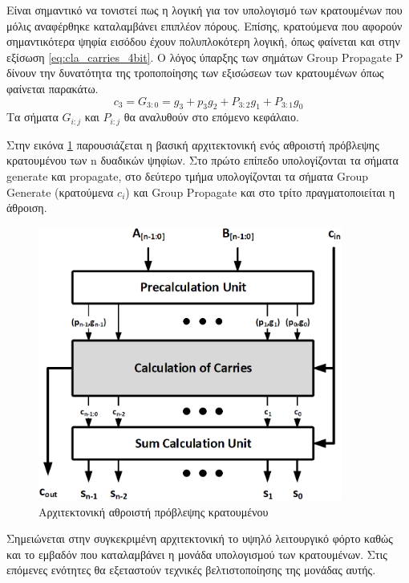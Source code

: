 Είναι σημαντικό να τονιστεί πως η λογική για τον υπολογισμό των κρατουμένων που μόλις αναφέρθηκε καταλαμβάνει επιπλέον πόρους. Επίσης, κρατούμενα που αφορούν σημαντικότερα ψηφία εισόδου έχουν πολυπλοκότερη λογική, όπως φαίνεται και στην εξίσωση \ref{eq:cla_carries_4bit}. Ο λόγος ύπαρξης των σημάτων Group Propagate P δίνουν την δυνατότητα της τροποποίησης των εξισώσεων των κρατουμένων όπως φαίνεται παρακάτω. 
\begin{equation*}
    c_3 = G_{3:0} = g_3 + p_3g_2 + P_{3:2}g_1 + P_{3:1}g_0 
\end{equation*}
Τα σήματα $G_{i:j}$ και $P_{i:j}$ θα αναλυθούν στο επόμενο κεφάλαιο.

Στην εικόνα \ref{cla_architecture} παρουσιάζεται η βασική αρχιτεκτονική ενός αθροιστή πρόβλεψης κρατουμένου των n δυαδικών ψηφίων. Στο πρώτο επίπεδο υπολογίζονται τα σήματα generate και propagate, στο δεύτερο τμήμα υπολογίζονται τα σήματα Group Generate (κρατούμενα $c_i$) και Group Propagate και στο τρίτο πραγματοποιείται η άθροιση.
\begin{figure}[H]
    \centering
    \includegraphics[height=9cm,width=10cm]{Pictures/CLA_Architecture.png}
    \caption{Αρχιτεκτονική αθροιστή πρόβλεψης κρατουμένου}
    \label{cla_architecture}
\end{figure}
 Σημειώνεται στην συγκεκριμένη αρχιτεκτονική το υψηλό λειτουργικό φόρτο καθώς και το εμβαδόν που καταλαμβάνει η μονάδα υπολογισμού των κρατουμένων. Στις επόμενες ενότητες θα εξεταστούν τεχνικές βελτιστοποίησης της μονάδας αυτής.
